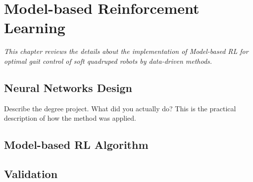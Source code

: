 \chapter{Model-based Reinforcement Learning}
\label{chap4}
\textit{This chapter reviews the details about the implementation of Model-based \ac{RL} for optimal gait control of soft quadruped robots by data-driven methods.}
\section{Neural Networks Design}
Describe the degree project. What did you actually do? This is the practical description of how the method was applied.

\section{Model-based RL Algorithm}

\section{Validation}